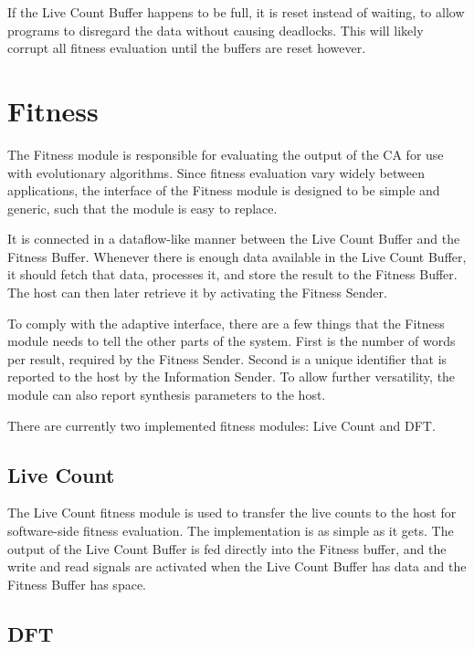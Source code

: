 If the Live Count Buffer happens to be full, it is reset instead of waiting, to allow programs to disregard the data without causing deadlocks.
This will likely corrupt all fitness evaluation until the buffers are reset however.


\section{Fitness}
\label{sec:fitness}

The Fitness module is responsible for evaluating the output of the CA for use with evolutionary algorithms.
Since fitness evaluation vary widely between applications, the interface of the Fitness module is designed to be simple and generic, such that the module is easy to replace.

It is connected in a dataflow-like manner between the Live Count Buffer and the Fitness Buffer.
Whenever there is enough data available in the Live Count Buffer, it should fetch that data, processes it, and store the result to the Fitness Buffer.
The host can then later retrieve it by activating the Fitness Sender.

To comply with the adaptive interface, there are a few things that the Fitness module needs to tell the other parts of the system.
First is the number of words per result, required by the Fitness Sender.
Second is a unique identifier that is reported to the host by the Information Sender.
To allow further versatility, the module can also report synthesis parameters to the host.

There are currently two implemented fitness modules: Live Count and DFT.

\subsection{Live Count}

The Live Count fitness module is used to transfer the live counts to the host for software-side fitness evaluation.
The implementation is as simple as it gets.
The output of the Live Count Buffer is fed directly into the Fitness buffer, and the write and read signals are activated when the Live Count Buffer has data and the Fitness Buffer has space.

\subsection{DFT}

